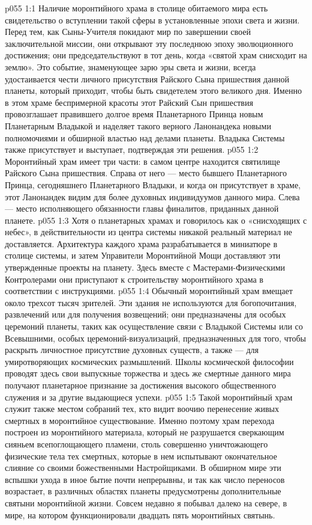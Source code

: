 \vs p055 1:1 Наличие моронтийного храма в столице обитаемого мира есть свидетельство о вступлении такой сферы в установленные эпохи света и жизни. Перед тем, как Сыны\hyp{}Учителя покидают мир по завершении своей заключительной миссии, они открывают эту последнюю эпоху эволюционного достижения; они председательствуют в тот день, когда «святой храм снисходит на землю». Это событие, знаменующее зарю эры света и жизни, всегда удостаивается чести личного присутствия Райского Сына пришествия данной планеты, который приходит, чтобы быть свидетелем этого великого дня. Именно в этом храме беспримерной красоты этот Райский Сын пришествия провозглашает правившего долгое время Планетарного Принца новым Планетарным Владыкой и наделяет такого верного Ланонандека новыми полномочиями и обширной властью над делами планеты. Владыка Системы также присутствует и выступает, подтверждая эти решения.
\vs p055 1:2 Моронтийный храм имеет три части: в самом центре находится святилище Райского Сына пришествия. Справа от него --- место бывшего Планетарного Принца, сегодняшнего Планетарного Владыки, и когда он присутствует в храме, этот Ланонандек видим для более духовных индивидуумов данного мира. Слева --- место исполняющего обязанности главы финалитов, приданных данной планете.
\vs p055 1:3 \pc Хотя о планетарных храмах и говорилось как о «снисходящих с небес», в действительности из центра системы никакой реальный материал не доставляется. Архитектура каждого храма разрабатывается в миниатюре в столице системы, и затем Управители Моронтийной Мощи доставляют эти утвержденные проекты на планету. Здесь вместе с Мастерами\hyp{}Физическими Контролерами они приступают к строительству моронтийного храма в соответствии с инструкциями.
\vs p055 1:4 \pc Обычный моронтийный храм вмещает около трехсот тысяч зрителей. Эти здания не используются для богопочитания, развлечений или для получения возвещений; они предназначены для особых церемоний планеты, таких как осуществление связи с Владыкой Системы или со Всевышними, особых церемоний\hyp{}визуализаций, предназначенных для того, чтобы раскрыть личностное присутствие духовных существ, а также --- для умиротворяющих космических размышлений. Школы космической философии проводят здесь свои выпускные торжества и здесь же смертные данного мира получают планетарное признание за достижения высокого общественного служения и за другие выдающиеся успехи.
\vs p055 1:5 Такой моронтийный храм служит также местом собраний тех, кто видит воочию перенесение живых смертных в моронтийное существование. Именно поэтому храм перехода построен из моронтийного материала, который не разрушается сверкающим сияньем всепоглощающего пламени, столь совершенно уничтожающего физические тела тех смертных, которые в нем испытывают окончательное слияние со своими божественными Настройщиками. В обширном мире эти вспышки ухода в иное бытие почти непрерывны, и так как число переносов возрастает, в различных областях планеты предусмотрены дополнительные святыни моронтийной жизни. Совсем недавно я побывал далеко на севере, в мире, на котором функционировали двадцать пять моронтийных святынь.
